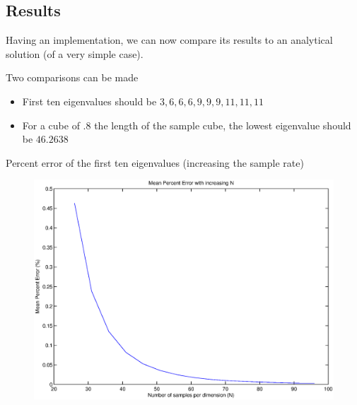 \documentclass{beamer}
\begin{document}
\subsection{Results}
\begin{frame}
Having an implementation, we can now compare its results to an analytical solution (of a very simple case).

Two comparisons can be made

\begin{itemize}
 \item First ten eigenvalues should be $3,6,6,6,9,9,9,11,11,11$
 \item For a cube of $.8$ the length of the sample cube, the lowest eigenvalue should be $46.2638$
\end{itemize}
\end{frame}


\begin{frame}[fragile]
Percent error of the first ten eigenvalues (increasing the sample rate)
\begin{figure}
\centering
\includegraphics[scale=0.4]{figures/meanPercentError.eps}
\end{figure}
\end{frame}
\end{document}
